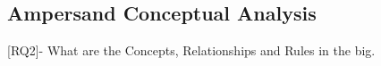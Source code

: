 


\subsection{Ampersand Conceptual Analysis}
[RQ2]- What are the Concepts, Relationships and Rules in the \acrshort{big}.
